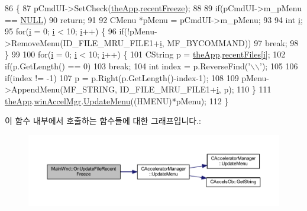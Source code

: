 \begin{DoxyCode}
86 \{
87   pCmdUI->SetCheck(\mbox{\hyperlink{_v_b_a_8cpp_a8095a9d06b37a7efe3723f3218ad8fb3}{theApp}}.\mbox{\hyperlink{class_v_b_a_a673f86057f7d022a426a1c1c3d6de36f}{recentFreeze}});
88 
89   \textcolor{keywordflow}{if}(pCmdUI->m\_pMenu == \mbox{\hyperlink{getopt1_8c_a070d2ce7b6bb7e5c05602aa8c308d0c4}{NULL}})
90     \textcolor{keywordflow}{return};
91   
92   CMenu *pMenu = pCmdUI->m\_pMenu;
93 
94   \textcolor{keywordtype}{int} \mbox{\hyperlink{expr-lex_8cpp_acb559820d9ca11295b4500f179ef6392}{i}};
95   \textcolor{keywordflow}{for}(\mbox{\hyperlink{expr-lex_8cpp_acb559820d9ca11295b4500f179ef6392}{i}} = 0; \mbox{\hyperlink{expr-lex_8cpp_acb559820d9ca11295b4500f179ef6392}{i}} < 10; \mbox{\hyperlink{expr-lex_8cpp_acb559820d9ca11295b4500f179ef6392}{i}}++) \{
96     \textcolor{keywordflow}{if}(!pMenu->RemoveMenu(ID\_FILE\_MRU\_FILE1+\mbox{\hyperlink{expr-lex_8cpp_acb559820d9ca11295b4500f179ef6392}{i}}, MF\_BYCOMMAND))
97       \textcolor{keywordflow}{break};
98   \}
99 
100   \textcolor{keywordflow}{for}(\mbox{\hyperlink{expr-lex_8cpp_acb559820d9ca11295b4500f179ef6392}{i}} = 0; \mbox{\hyperlink{expr-lex_8cpp_acb559820d9ca11295b4500f179ef6392}{i}} < 10; \mbox{\hyperlink{expr-lex_8cpp_acb559820d9ca11295b4500f179ef6392}{i}}++) \{
101     CString p = \mbox{\hyperlink{_v_b_a_8cpp_a8095a9d06b37a7efe3723f3218ad8fb3}{theApp}}.\mbox{\hyperlink{class_v_b_a_ab5efdeee24caf6cec163a3f51b50bf64}{recentFiles}}[\mbox{\hyperlink{expr-lex_8cpp_acb559820d9ca11295b4500f179ef6392}{i}}];
102     \textcolor{keywordflow}{if}(p.GetLength() == 0)
103       \textcolor{keywordflow}{break};
104     \textcolor{keywordtype}{int} index = p.ReverseFind(\textcolor{charliteral}{'\(\backslash\)\(\backslash\)'});
105 
106     \textcolor{keywordflow}{if}(index != -1)
107       p = p.Right(p.GetLength()-index-1);
108 
109     pMenu->AppendMenu(MF\_STRING, ID\_FILE\_MRU\_FILE1+\mbox{\hyperlink{expr-lex_8cpp_acb559820d9ca11295b4500f179ef6392}{i}}, p);
110   \}
111   \mbox{\hyperlink{_v_b_a_8cpp_a8095a9d06b37a7efe3723f3218ad8fb3}{theApp}}.\mbox{\hyperlink{class_v_b_a_ad7ebce057dbde0ca88cee75e84721a89}{winAccelMgr}}.\mbox{\hyperlink{class_c_accelerator_manager_ac7411d20f413ea0ec3bd65705b564adf}{UpdateMenu}}((HMENU)*pMenu);
112 \}
\end{DoxyCode}
이 함수 내부에서 호출하는 함수들에 대한 그래프입니다.\+:
\nopagebreak
\begin{figure}[H]
\begin{center}
\leavevmode
\includegraphics[width=350pt]{class_main_wnd_a105c377d7748cfb083db564e0f545383_cgraph}
\end{center}
\end{figure}
\mbox{\label{class_main_wnd_a14c19b1298d7910f712c2aa347e7fe19}} 
